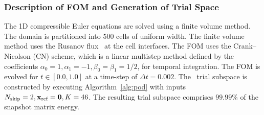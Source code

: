 \subsubsection{Description of FOM and Generation of Trial Space}
The 1D compressible Euler equations are solved using a finite volume method. The domain is partitioned into 500 cells of uniform width. The finite volume method uses the Rusanov flux~\cite{rusanov} at the cell interfaces. The FOM uses the Crank--Nicolson (CN) scheme, which is a linear multistep method defined by the coefficients $\alpha_0 = 1,\alpha_1 = -1, \beta_0 = \beta_1 = 1/2$, for temporal integration. The FOM is evolved for $t \in [0.0,1.0]$ at a time-step of $\Delta t = 0.002$. The \spatialAcronym\ trial subspace is constructed by executing Algorithm~\ref{alg:pod} with inputs $N_{\text{skip}}=2, \mathbf{x}_\text{ref} = \boldsymbol 0, K=46 $. The resulting trial subspace comprises $99.99\%$ of the snapshot matrix energy.

